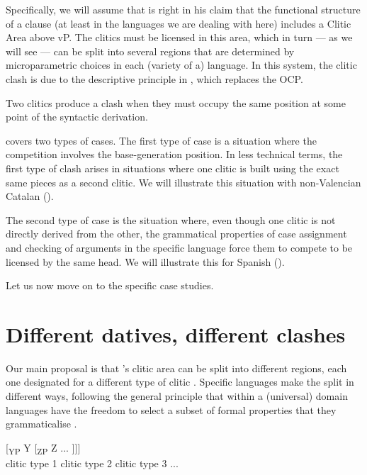 \documentclass[output=paper,modfonts,nonflat,newtxmath,colorlinks,citecolor=brown]{langsci/langscibook}
\begin{document}
 \label{ex:cabre:6}
    \z


Specifically, we will assume that \citet{Sportiche1996} is right in his claim that the functional structure of a clause (at least in the languages we are dealing with here) includes a Clitic Area above vP. The clitics must be licensed in this area, which in turn — as we will see — can be split into several regions that are determined by microparametric choices in each (variety of a) language. In this system, the clitic clash is due to the descriptive principle in , which replaces the OCP.

\ea%
\label{ex:cabre:7}
    Two clitics produce a clash when they must occupy the same   position at some point of the syntactic derivation.
    \z

          


 covers two types of cases. The first type of case is a situation where the competition involves the base-generation position. In less technical terms, the first type of clash arises in situations where one clitic is built using the exact same pieces as a second clitic. We will illustrate this situation with non-Valencian Catalan (). 

The second type of case is the situation where, even though one clitic is not directly derived from the other, the grammatical properties of case assignment and checking of arguments in the specific language force them to compete to be licensed by the same head. We will illustrate this for Spanish ().

Let us now move on to the specific case studies.

\section{Different datives, different clashes} %
\label{sec:cabre:3}

Our main proposal is that \citeauthor{Sportiche1996}’s clitic area can be split into different regions, each one designated for a different type of clitic . Specific languages make the split in different ways, following the general principle that within a (universal) domain languages have the freedom to select a subset of formal properties that they grammaticalise \citep{RamchandSvenonius2014, Wiltschko2014}. 

\ea%
    \label{ex:cabre:8}
    \gll {[\textsubscript{XP} X} { } {[\textsubscript{YP} Y} { }  {[\textsubscript{ZP}  Z} ...  ]]]\\
        \footnotesize {clitic type 1} { } \footnotesize {clitic type 2} \footnotesize   {clitic type 3} ...\\
    \glt
    \z
\end{document}
